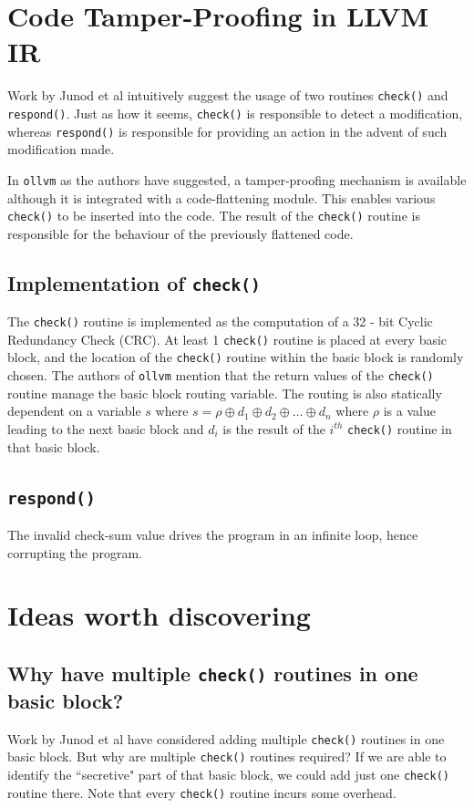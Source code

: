 \documentclass[11pt]{article}
\begin{document}
\section{Code Tamper-Proofing in LLVM IR}
Work by Junod et al intuitively suggest the usage of two routines \texttt{check()} and \texttt{respond()}. Just as how it seems, \texttt{check()} is responsible to detect a modification, whereas \texttt{respond()} is responsible for providing an action in the advent of such modification made.

In \texttt{ollvm} as the authors have suggested, a tamper-proofing mechanism is available although it is integrated with a code-flattening module. This enables various \texttt{check()} to be inserted into the code. The result of the \texttt{check()} routine is responsible for the behaviour of the previously flattened code. 

\subsection{Implementation of \texttt{check()}}
The \texttt{check()} routine is implemented as the computation of a 32 - bit Cyclic Redundancy Check (CRC). At least 1 \texttt{check()} routine is placed at every basic block, and the location of the \texttt{check()} routine within the basic block is randomly chosen. The authors of \texttt{ollvm} mention that the return values of the \texttt{check()} routine manage the basic block routing variable. The routing is also statically dependent on a variable \(s\) where \(s = \rho \oplus d_{1} \oplus d_{2} \oplus \ldots \oplus d_{n}\) where \(\rho\) is a value leading to the next basic block and \(d_{i}\) is the result of the \(i^{th}\) \texttt{check()} routine in that basic block.

\subsection{\texttt{respond()}}
The invalid check-sum value drives the program in an infinite loop, hence corrupting the program.

\section{Ideas worth discovering}
\subsection{Why have multiple \texttt{check()} routines in one basic block?}
Work by Junod et al \cite{DBLP:conf/icse/JunodRWM15} have considered adding multiple \texttt{check()} routines in one basic block. But why are multiple \texttt{check()} routines required? If we are able to identify the ``secretive" part of that basic block, we could add just one \texttt{check()} routine there. Note that every \texttt{check()} routine incurs some overhead.
\end{document}
